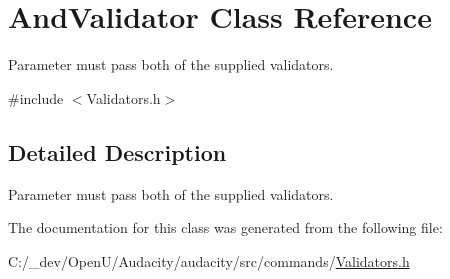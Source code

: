 \hypertarget{class_and_validator}{}\section{And\+Validator Class Reference}
\label{class_and_validator}


Parameter must pass both of the supplied validators.  




{\ttfamily \#include $<$Validators.\+h$>$}



\subsection{Detailed Description}
Parameter must pass both of the supplied validators. 

The documentation for this class was generated from the following file\+:\begin{DoxyCompactItemize}
\item 
C\+:/\+\_\+dev/\+Open\+U/\+Audacity/audacity/src/commands/\hyperlink{_validators_8h}{Validators.\+h}\end{DoxyCompactItemize}
